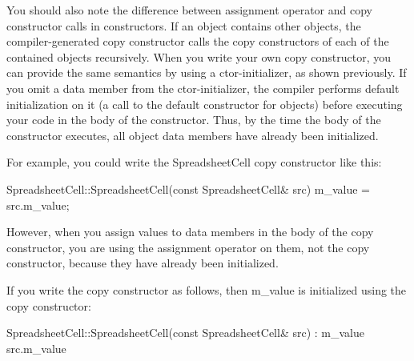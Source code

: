 You should also note the difference between assignment operator and copy constructor calls in constructors. If an object contains other objects, the compiler-generated copy constructor calls the copy constructors of each of the contained objects recursively. When you write your own copy constructor, you can provide the same semantics by using a ctor-initializer, as shown previously. If you omit a data member from the ctor-initializer, the compiler performs default initialization on it (a call to the default constructor for objects) before executing your code in the body of the constructor. Thus, by the time the body of the constructor executes, all object data members have already been initialized.

For example, you could write the SpreadsheetCell copy constructor like this:

\begin{cpp}
SpreadsheetCell::SpreadsheetCell(const SpreadsheetCell& src)
{
    m_value = src.m_value;
}
\end{cpp}

However, when you assign values to data members in the body of the copy constructor, you are using the assignment operator on them, not the copy constructor, because they have already been initialized.

If you write the copy constructor as follows, then m\_value is initialized using the copy constructor:

\begin{cpp}
SpreadsheetCell::SpreadsheetCell(const SpreadsheetCell& src)
: m_value { src.m_value }
{}
\end{cpp}




















